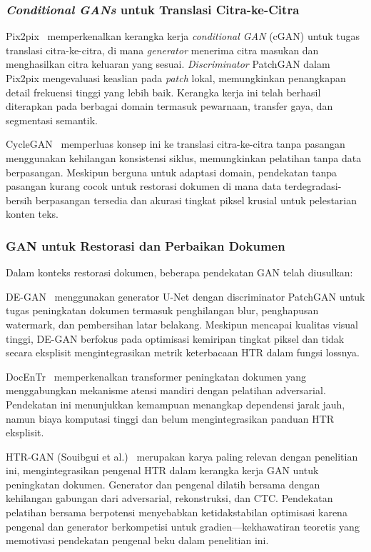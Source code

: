\documentclass[journal]{IEEEtran}
\begin{document}
\subsubsection{\textit{Conditional GANs} untuk Translasi Citra-ke-Citra}

Pix2pix~\cite{isola2017image} memperkenalkan kerangka kerja \textit{conditional GAN} (cGAN) untuk tugas translasi citra-ke-citra, di mana \textit{generator} menerima citra masukan dan menghasilkan citra keluaran yang sesuai. \textit{Discriminator} PatchGAN dalam Pix2pix mengevaluasi keaslian pada \textit{patch} lokal, memungkinkan penangkapan detail frekuensi tinggi yang lebih baik. Kerangka kerja ini telah berhasil diterapkan pada berbagai domain termasuk pewarnaan, transfer gaya, dan segmentasi semantik.

CycleGAN~\cite{zhu2017unpaired} memperluas konsep ini ke translasi citra-ke-citra tanpa pasangan menggunakan kehilangan konsistensi siklus, memungkinkan pelatihan tanpa data berpasangan. Meskipun berguna untuk adaptasi domain, pendekatan tanpa pasangan kurang cocok untuk restorasi dokumen di mana data terdegradasi-bersih berpasangan tersedia dan akurasi tingkat piksel krusial untuk pelestarian konten teks.

\subsubsection{GAN untuk Restorasi dan Perbaikan Dokumen}

Dalam konteks restorasi dokumen, beberapa pendekatan GAN telah diusulkan:

DE-GAN~\cite{souibgui2020degan} menggunakan generator U-Net dengan discriminator PatchGAN untuk tugas peningkatan dokumen termasuk penghilangan blur, penghapusan watermark, dan pembersihan latar belakang. Meskipun mencapai kualitas visual tinggi, DE-GAN berfokus pada optimisasi kemiripan tingkat piksel dan tidak secara eksplisit mengintegrasikan metrik keterbacaan HTR dalam fungsi lossnya.

DocEnTr~\cite{souibgui2022docent} memperkenalkan transformer peningkatan dokumen yang menggabungkan mekanisme atensi mandiri dengan pelatihan adversarial. Pendekatan ini menunjukkan kemampuan menangkap dependensi jarak jauh, namun biaya komputasi tinggi dan belum mengintegrasikan panduan HTR eksplisit.

HTR-GAN (Souibgui et al.)~\cite{souibgui2021enhance} merupakan karya paling relevan dengan penelitian ini, mengintegrasikan pengenal HTR dalam kerangka kerja GAN untuk peningkatan dokumen. Generator dan pengenal dilatih bersama dengan kehilangan gabungan dari adversarial, rekonstruksi, dan CTC. Pendekatan pelatihan bersama berpotensi menyebabkan ketidakstabilan optimisasi karena pengenal dan generator berkompetisi untuk gradien—kekhawatiran teoretis yang memotivasi pendekatan pengenal beku dalam penelitian ini.
\end{document}
